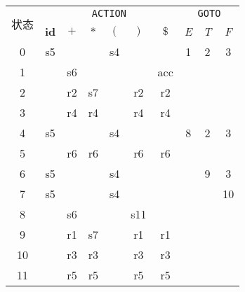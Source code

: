 \documentclass[border=1em,varwidth=\maxdimen]{standalone}
\begin{document}
\begin{table}
  \begin{tabular}{cccccccccc}
    \toprule
    \multirow{2}{*}{状态} & \multicolumn{6}{c}{\texttt{ACTION}} &
                                                                  \multicolumn{3}{c}{\texttt{GOTO}}\\
    \cline{2-10}
                          & \textbf{id} & \(+\) & \(*\) & \((\) & \()\) & \(\$\)
                                                                & \textit{E} &
                                                                               \textit{T} & \textit{F} \\
    \midrule
    0 & s5 & & & s4 & & & 1 & 2 & 3\\
    1 & & s6 & & & & acc & & & \\
    2 & & r2 & s7 & & r2 & r2 & & & \\
    3 & & r4 & r4 & & r4 & r4 & & & \\
    4 & s5 & & & s4 & & & 8 & 2 & 3\\
    5 & & r6 & r6 & & r6 & r6 & & & \\
    6 & s5 & & & s4 & & & & 9 & 3\\
    7 & s5 & & & s4 & & & & & 10\\
    8 & & s6 & & & s11 & & & & \\
    9 & & r1 & s7 & & r1 & r1 & & & \\
    10 & & r3 & r3 & & r3 & r3 & & & \\
    11 & & r5 & r5 & & r5 & r5 & & & \\
    \bottomrule
  \end{tabular}
\end{table}
\end{document}
